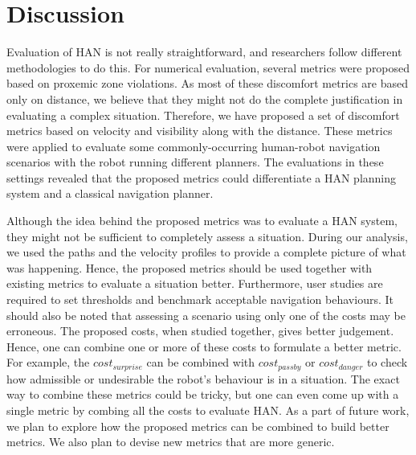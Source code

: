 \section{Discussion}\label{conclude_metrics}
Evaluation of HAN is not really straightforward, and researchers follow different methodologies to do this. For numerical evaluation, several metrics were proposed based on proxemic zone violations. As most of these discomfort metrics are based only on distance, we believe that they might not do the complete justification in evaluating a complex situation. Therefore, we have proposed a set of discomfort metrics based on velocity and visibility along with the distance. These metrics were applied to evaluate some commonly-occurring human-robot navigation scenarios with the robot running different planners. The evaluations in these settings revealed that the proposed metrics could differentiate a HAN planning system and a classical navigation planner. 

Although the idea behind the proposed metrics was to evaluate a HAN system, they might not be sufficient to completely assess a situation. During our analysis, we used the paths and the velocity profiles to provide a complete picture of what was happening. Hence, the proposed metrics should be used together with existing metrics to evaluate a situation better. Furthermore, user studies are required to set thresholds and benchmark acceptable navigation behaviours. It should also be noted that assessing a scenario using only one of the costs may be erroneous. The proposed costs, when studied together, gives better judgement. Hence, one can combine one or more of these costs to formulate a better metric. For example, the $cost_{surprise}$ can be combined with $cost_{passby}$ or $cost_{danger}$ to check how admissible or undesirable the robot's behaviour is in a situation. The exact way to combine these metrics could be tricky, but one can even come up with a single metric by combing all the costs to evaluate HAN. As a part of future work, we plan to explore how the proposed metrics can be combined to build better metrics. We also plan to devise new metrics that are more generic.   

